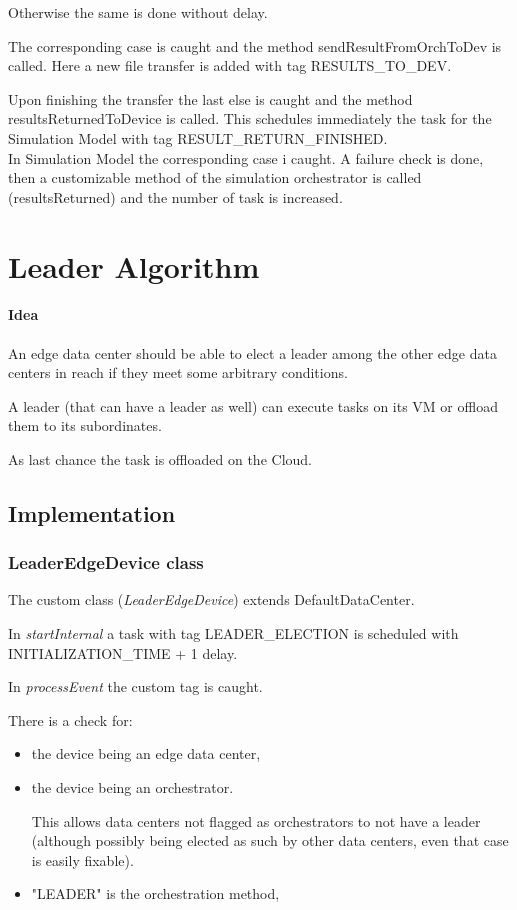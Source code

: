\documentclass[12pt]{report}
\begin{document}
Otherwise the same is done without delay.

The corresponding case is caught and the method sendResultFromOrchToDev is called. Here a new file transfer is added with tag RESULTS\_TO\_DEV.

Upon finishing the transfer the last else is caught and the method \mbox{resultsReturnedToDevice} is called. This schedules immediately the task for the Simulation Model with tag RESULT\_RETURN\_FINISHED.
\\
In Simulation Model the corresponding case i caught. A failure check is done, then a customizable method of the simulation orchestrator is called (resultsReturned) and the number of task is increased.

\section{Leader Algorithm}
\label{leader algo}
\paragraph*{Idea}
An edge data center should be able to elect a leader among the other edge data centers in reach if they meet some arbitrary conditions.

A leader (that can have a leader as well) can execute tasks on its VM or offload them to its subordinates.

As last chance the task is offloaded on the Cloud.

\subsection*{Implementation}

\subsubsection*{LeaderEdgeDevice class}
The custom class (\textit{LeaderEdgeDevice}) extends DefaultDataCenter.

In \textit{startInternal} a task with tag LEADER\_ELECTION is scheduled with INITIALIZATION\_TIME + 1 delay.

In \textit{processEvent} the custom tag is caught.

There is a check for:
 	\begin{itemize}
 		\item the device being an edge data center,
 		\item the device being an orchestrator.
 		
 		This allows data centers not flagged as orchestrators to not have a leader (although possibly being elected as such by other data centers, even that case is easily fixable).
 		\item "LEADER" is the orchestration method,
  	\end{itemize}
\end{document}
